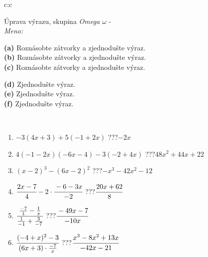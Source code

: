 \documentclass[10pt]{report}
\begin{document}
\newpage
\thispagestyle{empty}
\begin{tabular}{c:c}
\begin{minipage}[c][104.5mm][t]{0.5\linewidth}
\begin{center}
\vspace{7mm}
{\huge Úprava výrazu, skupina \textit{Omega $\omega$} -}\\[5mm]
\textit{Meno:}\phantom{xxxxxxxxxxxxxxxxxxxxxxxxxxxxxxxxxxxxxxxxxxxxxxxxxxxxxxxxxxxxxxxxx}\\[5mm]
\begin{minipage}{0.95\linewidth}
\begin{center}
{\small \begin{minipage}{0.6\textwidth}
\textbf{(a)} Roznásobte zátvorky a zjednodušte výraz. \\[1mm]
\textbf{(b)} Roznásobte zátvorky a zjednodušte výraz. \\[1mm]
\textbf{(c)} Roznásobte zátvorky a zjednodušte výraz.
\end{minipage} \begin{minipage}{0.39\textwidth}
\textbf{(d)} Zjednodušte výraz. \\[1mm]
\textbf{(e)} Zjednodušte výraz. \\[1mm]
\textbf{(f)} Zjednodušte výraz.
\end{minipage}
}
\end{center}
\end{minipage}
\\[4mm]
\begin{minipage}{0.79\linewidth}
\begin{center}
\begin{varwidth}{\linewidth}
\begin{enumerate}
\normalsize
\item $-3(4x+3)+5(-1+2x)$\quad \dotfill\; ???\;\dotfill \quad $-2x$
\item $4(-1-2x)(-6x-4)-3(-2+4x)$\quad \dotfill\; ???\;\dotfill \quad $48x^2+44x+22$
\item $(x-2)^3-(6x-2)^2$\quad \dotfill\; ???\;\dotfill \quad $-x^3-42x^2-12$
\item $\cfrac{2x-7}{4}-2\cdot\cfrac{-6-3x}{-2}$\quad \dotfill\; ???\;\dotfill \quad $\cfrac{20x+62}{8}$
\item $\cfrac{\frac{-7}{1}-\frac{1}{x}}{\frac{1}{-1}+\frac{3}{-7}}$\quad \dotfill\; ???\;\dotfill \quad $\cfrac{-49x-7}{-10x}$
\item $\cfrac{(-4+x)^2-3}{(6x+3)\cdot\frac{-7}{x}}$\quad \dotfill\; ???\;\dotfill \quad $\cfrac{x^3-8x^2+13x}{-42x-21}$

\end{enumerate}
\end{varwidth}
\end{center}
\end{minipage}
\end{center}
\end{minipage}
\end{tabular}
\end{document}
